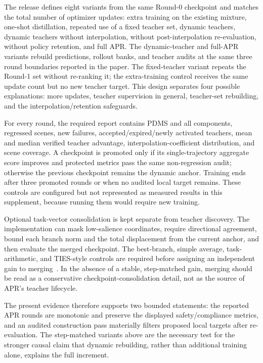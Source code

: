 The release defines eight variants from the same Round-0 checkpoint and
matches the total number of optimizer updates: extra training on the existing
mixture, one-shot distillation, repeated use of a fixed teacher set, dynamic
teachers, dynamic teachers without interpolation, without post-interpolation
re-evaluation, without policy retention, and full APR.  The dynamic-teacher
and full-APR variants rebuild predictions, rollout banks, and teacher audits at
the same three round boundaries reported in the paper.  The fixed-teacher
variant repeats the Round-1 set without re-ranking it; the extra-training
control receives the same update count but no new teacher target.  This design
separates four possible explanations: more updates, teacher supervision in
general, teacher-set rebuilding, and the interpolation/retention safeguards.

For every round, the required report contains PDMS and all components,
regressed scenes, new failures, accepted/expired/newly activated teachers,
mean and median verified teacher advantage, interpolation-coefficient
distribution, and scene coverage.  A checkpoint is promoted only if its
single-trajectory aggregate score improves and protected metrics pass the
same non-regression audit; otherwise the previous checkpoint remains the
dynamic anchor.  Training ends after three promoted rounds or when no audited
local target remains.  These controls are configured but not represented as
measured results in this supplement, because running them would require new
training.

Optional task-vector consolidation is kept separate from teacher discovery.
The implementation can mask low-salience coordinates, require directional
agreement, bound each branch norm and the total displacement from the current
anchor, and then evaluate the merged checkpoint.  The best-branch, simple
average, task-arithmetic, and TIES-style controls are required before assigning
an independent gain to merging~\cite{taskarithmetic2023,ties2023}.  In the
absence of a stable, step-matched gain, merging should be read as a conservative
checkpoint-consolidation detail, not as the source of APR's teacher lifecycle.

The present evidence therefore supports two bounded statements: the reported
APR rounds are monotonic and preserve the displayed safety/compliance metrics,
and an audited construction pass materially filters proposed local targets
after re-evaluation.  The step-matched variants above are the necessary test
for the stronger causal claim that dynamic rebuilding, rather than additional
training alone, explains the full increment.



